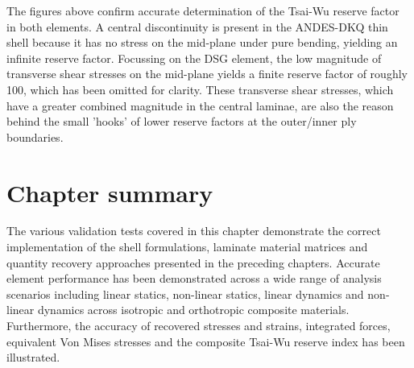 The figures above confirm accurate determination of the Tsai-Wu reserve factor in both elements. A central discontinuity is present in the ANDES-DKQ thin shell because it has no stress on the mid-plane under pure bending, yielding an infinite reserve factor. Focussing on the DSG element, the low magnitude of transverse shear stresses on the mid-plane yields a finite reserve factor of roughly 100, which has been omitted for clarity. These transverse shear stresses, which have a greater combined magnitude in the central laminae, are also the reason behind the small 'hooks' of lower reserve factors at the outer/inner ply boundaries.

\section{Chapter summary}
The various validation tests covered in this chapter demonstrate the correct implementation of the shell formulations, laminate material matrices and quantity recovery approaches presented in the preceding chapters. Accurate element performance has been demonstrated across a wide range of analysis scenarios including linear statics, non-linear statics, linear dynamics and non-linear dynamics across isotropic and orthotropic composite materials. Furthermore, the accuracy of recovered stresses and strains, integrated forces, equivalent Von Mises stresses and the composite Tsai-Wu reserve index has been illustrated.